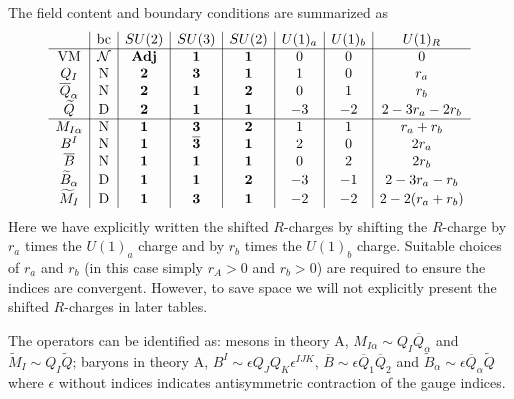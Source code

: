 \documentclass[12pt]{article}
\numberwithin{equation}{section}
\begin{document}
The field content and boundary conditions are summarized as
\begin{align}
\label{SUN_6_charges}
\begin{array}{c|c|c|c|c|c|c|c}
& \textrm{bc} & SU(2) & SU(3) & SU(2) & U(1)_a & U(1)_b & U(1)_R \\ \hline
\textrm{VM} & \mathcal{N} & {\bf Adj} & {\bf 1} & {\bf 1} & 0 & 0 & 0 \\
Q_I & \textrm{N} & {\bf 2} & {\bf 3} & {\bf 1} & 1 & 0 & r_a \\
\overline{Q}_{\alpha} & \textrm{N} & {\bf 2} & {\bf 1} & {\bf 2} & 0 & 1 & r_b \\
\widetilde{Q} & \textrm{D} & {\bf 2} & {\bf 1} & {\bf 1} & -3 & -2 & 2 -3r_a-2r_b \\
 \hline
M_{I\alpha} & \textrm{N} & {\bf 1} & {\bf 3} & {\bf 2} & 1 & 1 & r_a+r_b \\
B^I & \textrm{N} & {\bf 1} & {\bf \overline{3}} & {\bf 1} & 2 & 0 & 2r_a \\
\overline{B} & \textrm{N} & {\bf 1} & {\bf 1} & {\bf 1} & 0 & 2 & 2r_b \\
\widetilde{B}_{\alpha} & \textrm{D} & {\bf 1} & {\bf 1} & {\bf 2} & -3 & -1 & 2 - 3r_a-r_b \\
\widetilde{M}_I & \textrm{D} & {\bf 1} & {\bf 3} & {\bf 1} & -2 & -2 & 2 - 2(r_a+r_b) \\
\end{array}
\end{align}
Here we have explicitly written the shifted $R$-charges by shifting the $R$-charge by $r_a$ times the $U(1)_a$ charge and by $r_b$ times the $U(1)_b$ charge. Suitable choices of $r_a$ and $r_b$ (in this case simply $r_A > 0$ and $r_b > 0$) are required to ensure the indices are convergent. However, to save space we will not explicitly present the shifted $R$-charges in later tables.

The operators can be identified as: mesons in theory A, $M_{I \alpha} \sim Q_I \overline{Q}_{\alpha}$ and $\widetilde{M}_I \sim Q_I \widetilde{Q}$; baryons in theory A, $B^I \sim \epsilon Q_J Q_K \epsilon^{IJK}$, $\overline{B} \sim \epsilon \overline{Q}_1 \overline{Q}_2$ and $\widetilde{B}_{\alpha} \sim \epsilon \overline{Q}_{\alpha} \widetilde{Q}$ where $\epsilon$ without indices indicates antisymmetric contraction of the gauge indices.
\end{document}

